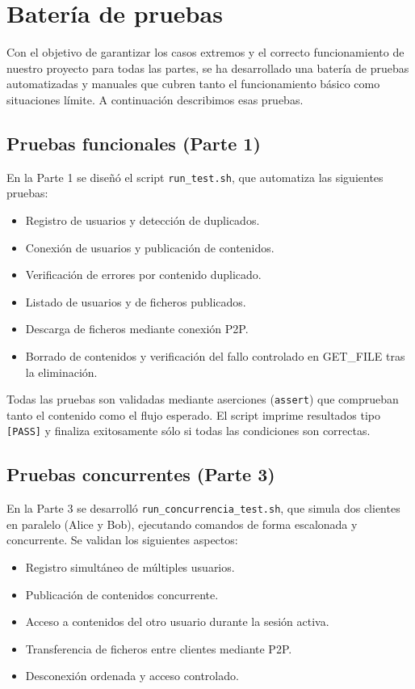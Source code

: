 \documentclass[12pt,a4paper]{article}
\begin{document}
\section{Batería de pruebas}

Con el objetivo de garantizar los casos extremos y el correcto funcionamiento de nuestro proyecto para todas las partes, se ha desarrollado una batería de pruebas automatizadas y manuales que cubren tanto el funcionamiento básico como situaciones límite. A continuación describimos esas pruebas.

\subsection{Pruebas funcionales (Parte 1)}

En la Parte 1 se diseñó el script \texttt{run\_test.sh}, que automatiza las siguientes pruebas:

\begin{itemize}
    \item Registro de usuarios y detección de duplicados.
    \item Conexión de usuarios y publicación de contenidos.
    \item Verificación de errores por contenido duplicado.
    \item Listado de usuarios y de ficheros publicados.
    \item Descarga de ficheros mediante conexión P2P.
    \item Borrado de contenidos y verificación del fallo controlado en GET\_FILE tras la eliminación.
\end{itemize}

Todas las pruebas son validadas mediante aserciones (\texttt{assert}) que comprueban tanto el contenido como el flujo esperado. El script imprime resultados tipo \texttt{[PASS]} y finaliza exitosamente sólo si todas las condiciones son correctas.

\subsection{Pruebas concurrentes (Parte 3)}

En la Parte 3 se desarrolló \texttt{run\_concurrencia\_test.sh}, que simula dos clientes en paralelo (Alice y Bob), ejecutando comandos de forma escalonada y concurrente. Se validan los siguientes aspectos:

\begin{itemize}
    \item Registro simultáneo de múltiples usuarios.
    \item Publicación de contenidos concurrente.
    \item Acceso a contenidos del otro usuario durante la sesión activa.
    \item Transferencia de ficheros entre clientes mediante P2P.
    \item Desconexión ordenada y acceso controlado.
\end{itemize}
\end{document}
